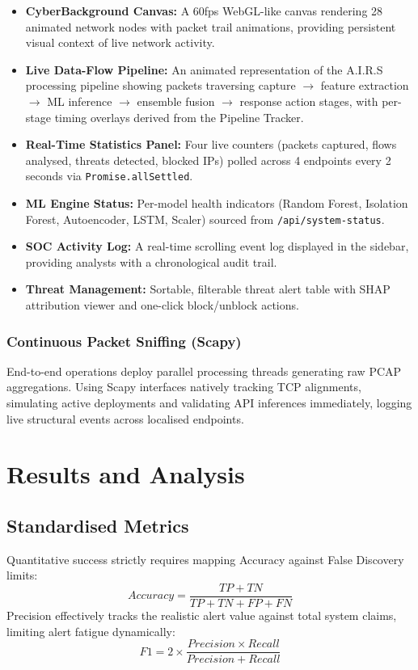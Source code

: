\documentclass[conference]{IEEEtran}
\begin{document}
\begin{itemize}
    \item \textbf{CyberBackground Canvas:} A 60fps WebGL-like canvas rendering 28 animated network nodes with packet trail animations, providing persistent visual context of live network activity.
    \item \textbf{Live Data-Flow Pipeline:} An animated representation of the A.I.R.S processing pipeline showing packets traversing capture $\rightarrow$ feature extraction $\rightarrow$ ML inference $\rightarrow$ ensemble fusion $\rightarrow$ response action stages, with per-stage timing overlays derived from the Pipeline Tracker.
    \item \textbf{Real-Time Statistics Panel:} Four live counters (packets captured, flows analysed, threats detected, blocked IPs) polled across 4 endpoints every 2 seconds via \texttt{Promise.allSettled}.
    \item \textbf{ML Engine Status:} Per-model health indicators (Random Forest, Isolation Forest, Autoencoder, LSTM, Scaler) sourced from \texttt{/api/system-status}.
    \item \textbf{SOC Activity Log:} A real-time scrolling event log displayed in the sidebar, providing analysts with a chronological audit trail.
    \item \textbf{Threat Management:} Sortable, filterable threat alert table with SHAP attribution viewer and one-click block/unblock actions.
\end{itemize}

\subsubsection{Continuous Packet Sniffing (Scapy)}
End-to-end operations deploy parallel processing threads generating raw PCAP aggregations. Using Scapy interfaces natively tracking TCP alignments, simulating active deployments and validating API inferences immediately, logging live structural events across localised endpoints.

\section{Results and Analysis}

\subsection{Standardised Metrics}
Quantitative success strictly requires mapping Accuracy against False Discovery limits:
\begin{equation}
    Accuracy = \frac{TP + TN}{TP + TN + FP + FN}
\end{equation}
Precision effectively tracks the realistic alert value against total system claims, limiting alert fatigue dynamically:
\begin{equation}
    F1 = 2 \times \frac{Precision \times Recall}{Precision + Recall}
\end{equation}
\end{document}
